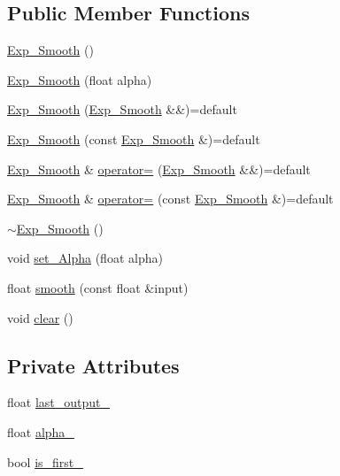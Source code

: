 \subsection*{Public Member Functions}
\begin{DoxyCompactItemize}
\item 
\mbox{\hyperlink{class_exp___smooth_a51fa3033647299932db14d5b14f5e7e1}{Exp\+\_\+\+Smooth}} ()
\item 
\mbox{\hyperlink{class_exp___smooth_a06681bf09505f9a271fc541cad30d562}{Exp\+\_\+\+Smooth}} (float alpha)
\item 
\mbox{\hyperlink{class_exp___smooth_a3dc9204af30caecd3a7c298f3b392b18}{Exp\+\_\+\+Smooth}} (\mbox{\hyperlink{class_exp___smooth}{Exp\+\_\+\+Smooth}} \&\&)=default
\item 
\mbox{\hyperlink{class_exp___smooth_ad21b2fa9537b68e1e6b7cc57cf1d0ce9}{Exp\+\_\+\+Smooth}} (const \mbox{\hyperlink{class_exp___smooth}{Exp\+\_\+\+Smooth}} \&)=default
\item 
\mbox{\hyperlink{class_exp___smooth}{Exp\+\_\+\+Smooth}} \& \mbox{\hyperlink{class_exp___smooth_a8d1aa6ab0c0e249815157a30beab2e08}{operator=}} (\mbox{\hyperlink{class_exp___smooth}{Exp\+\_\+\+Smooth}} \&\&)=default
\item 
\mbox{\hyperlink{class_exp___smooth}{Exp\+\_\+\+Smooth}} \& \mbox{\hyperlink{class_exp___smooth_a85aa3470f7947c594dde0706260e3eea}{operator=}} (const \mbox{\hyperlink{class_exp___smooth}{Exp\+\_\+\+Smooth}} \&)=default
\item 
\mbox{\hyperlink{class_exp___smooth_ae0c40c45c671cc5dfe6e8880acdbb2d8}{$\sim$\+Exp\+\_\+\+Smooth}} ()
\item 
void \mbox{\hyperlink{class_exp___smooth_a4c87027d0aaaef41619f63b7358f9ef8}{set\+\_\+\+Alpha}} (float alpha)
\item 
float \mbox{\hyperlink{class_exp___smooth_a1815075200efb490ced9f1e34e5e63bf}{smooth}} (const float \&input)
\item 
void \mbox{\hyperlink{class_exp___smooth_a3362788db2595048d3fc90622a7c1340}{clear}} ()
\end{DoxyCompactItemize}
\subsection*{Private Attributes}
\begin{DoxyCompactItemize}
\item 
float \mbox{\hyperlink{class_exp___smooth_aff65e096d091a21d1cec4fb5b7300269}{last\+\_\+output\+\_\+}}
\item 
float \mbox{\hyperlink{class_exp___smooth_a0406c67c983a212c0e744fff4672399b}{alpha\+\_\+}}
\item 
bool \mbox{\hyperlink{class_exp___smooth_af3defd741b8369bbbbfea3ddeee2c20c}{is\+\_\+first\+\_\+}}
\end{DoxyCompactItemize}


